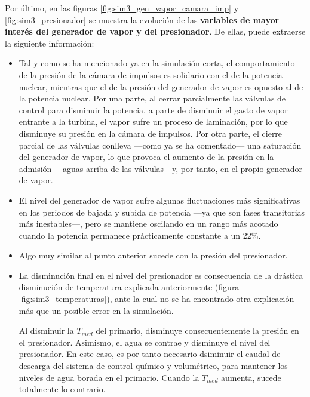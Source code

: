 Por último, en las figuras \ref{fig:sim3_gen_vapor_camara_imp} y \ref{fig:sim3_presionador} se muestra la evolución de las \textbf{variables de mayor interés del generador de vapor y del presionador}. De ellas, puede extraerse la siguiente información:

\begin{itemize}
  \item Tal y como se ha mencionado ya en la simulación corta, el comportamiento de la presión de la cámara de impulsos es solidario con el de la potencia nuclear, mientras que el de la presión del generador de vapor es opuesto al de la potencia nuclear. Por una parte, al cerrar parcialmente las válvulas de control para disminuir la potencia, a parte de disminuir el gasto de vapor entrante a la turbina, el vapor sufre un proceso de laminación, por lo que disminuye su presión en la cámara de impulsos. Por otra parte, el cierre parcial de las válvulas conlleva ---como ya se ha comentado--- una saturación del generador de vapor, lo que provoca el aumento de la presión en la admisión ---aguas arriba de las válvulas---y, por tanto, en el propio generador de vapor.
  \item El nivel del generador de vapor sufre algunas fluctuaciones más significativas en los periodos de bajada y subida de potencia ---ya que son fases transitorias más inestables---, pero se mantiene oscilando en un rango más acotado cuando la potencia permanece prácticamente constante a un 22\%.
  \item Algo muy similar al punto anterior sucede con la presión del presionador.
  \item La disminución final en el nivel del presionador es consecuencia de la drástica disminución de temperatura explicada anteriormente (figura \ref{fig:sim3_temperaturas}), ante la cual no se ha encontrado otra explicación más que un posible error en la simulación. 
  
  Al disminuir la $T_{med}$ del primario, disminuye consecuentemente la presión en el presionador. Asimismo, el agua se contrae y disminuye el nivel del presionador. En este caso, es por tanto necesario dsiminuir el caudal de descarga del sistema de control químico y volumétrico, para mantener los niveles de agua borada en el primario. Cuando la $T_{med}$ aumenta, sucede totalmente lo contrario.
\end{itemize}

